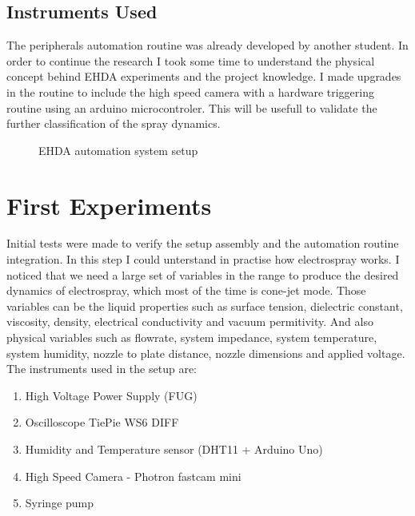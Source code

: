 \subsection{Instruments Used}
\label{subsec:instruments}

The peripherals automation routine was already developed by another student. In order to continue the research I took some time to understand the physical concept behind EHDA experiments and the project knowledge.
I made upgrades in the routine to include the high speed camera with a hardware triggering routine using an arduino microcontroler. This will be usefull to validate the further classification of the spray dynamics.



\begin{figure}[H]
  \centering
  \caption{EHDA automation system setup}
  \label{fig:setup}
\end{figure}


\section{First Experiments}
\label{sec:first_experiments}

Initial tests were made to verify the setup assembly and the automation routine integration. In this step I could unterstand in practise how electrospray works.
I noticed that we need a large set of variables in the range to produce the desired dynamics of electrospray, which most of the time is cone-jet mode. Those variables can be the liquid properties such as surface tension, dielectric constant, viscosity, density, electrical conductivity and vacuum permitivity. And also physical variables such as flowrate, system impedance, system temperature, system humidity, nozzle to plate distance, nozzle dimensions and applied voltage.
The instruments used in the setup are:

\begin{enumerate}[a]
  \item High Voltage Power Supply (FUG)
  \item Oscilloscope TiePie WS6 DIFF 
  \item Humidity and Temperature sensor (DHT11 + Arduino Uno)
  \item High Speed Camera - Photron fastcam mini
  \item Syringe pump
  \end{enumerate}


\clearpage
